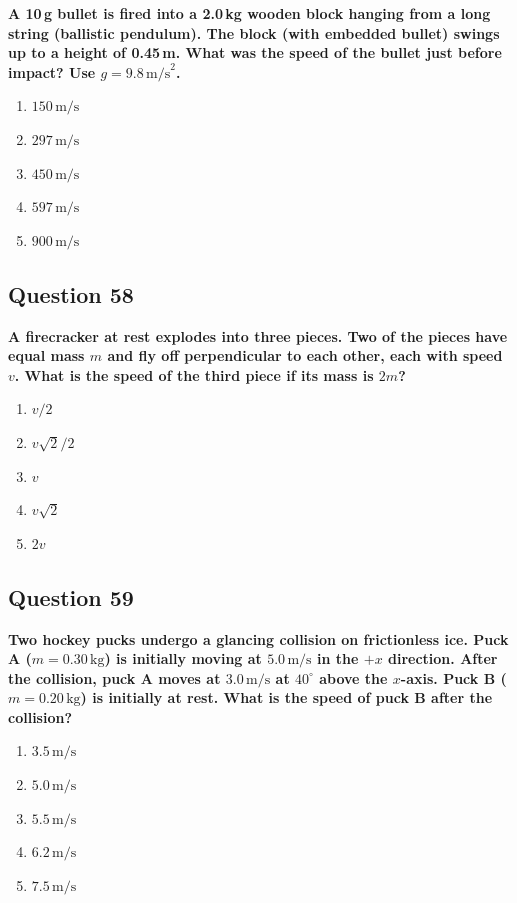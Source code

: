 \documentclass[12pt,letterpaper]{article}
\begin{document}
\begin{questionbox}
\textbf{A 10\,g bullet is fired into a 2.0\,kg wooden block hanging from a long string (ballistic pendulum). The block (with embedded bullet) swings up to a height of 0.45\,m. What was the speed of the bullet just before impact? Use $g = 9.8\,\text{m/s}^2$.}

\begin{enumerate}[label=\alph*)]
    \item $150\,\text{m/s}$
    \item $297\,\text{m/s}$
    \item $450\,\text{m/s}$
    \item $597\,\text{m/s}$
    \item $900\,\text{m/s}$
\end{enumerate}
\end{questionbox}

\subsection{Question 58}

\begin{questionbox}
\textbf{A firecracker at rest explodes into three pieces. Two of the pieces have equal mass $m$ and fly off perpendicular to each other, each with speed $v$. What is the speed of the third piece if its mass is $2m$?}

\begin{enumerate}[label=\alph*)]
    \item $v/2$
    \item $v\sqrt{2}/2$
    \item $v$
    \item $v\sqrt{2}$
    \item $2v$
\end{enumerate}
\end{questionbox}

\subsection{Question 59}

\begin{questionbox}
\textbf{Two hockey pucks undergo a glancing collision on frictionless ice. Puck A ($m = 0.30\,\text{kg}$) is initially moving at $5.0\,\text{m/s}$ in the $+x$ direction. After the collision, puck A moves at $3.0\,\text{m/s}$ at $40^\circ$ above the $x$-axis. Puck B ($m = 0.20\,\text{kg}$) is initially at rest. What is the speed of puck B after the collision?}

\begin{enumerate}[label=\alph*)]
    \item $3.5\,\text{m/s}$
    \item $5.0\,\text{m/s}$
    \item $5.5\,\text{m/s}$
    \item $6.2\,\text{m/s}$
    \item $7.5\,\text{m/s}$
\end{enumerate}
\end{questionbox}
\end{document}
